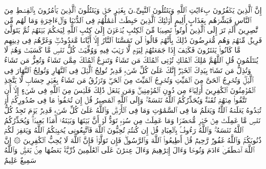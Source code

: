 \stopbuffer
\startbuffer[\q:3:21]
إِنَّ ٱلَّذِینَ یَكۡفُرُونَ بِءَایَٰتِ ٱللَّهِ وَیَقۡتُلُونَ ٱلنَّبِیِّۦنَ بِغَیۡرِ حَقࣲّ وَیَقۡتُلُونَ ٱلَّذِینَ یَأۡمُرُونَ بِٱلۡقِسۡطِ مِنَ ٱلنَّاسِ فَبَشِّرۡهُم بِعَذَابٍ أَلِیمٍ%
\stopbuffer
\startbuffer[\q:3:22]
أُو۟لَٰۤئِكَ ٱلَّذِینَ حَبِطَتۡ أَعۡمَٰلُهُمۡ فِی ٱلدُّنۡیَا وَٱلۡءَاخِرَةِ وَمَا لَهُم مِّن نَّٰصِرِینَ%
\stopbuffer
\startbuffer[\q:3:23]
أَلَمۡ تَرَ إِلَى ٱلَّذِینَ أُوتُوا۟ نَصِیبࣰا مِّنَ ٱلۡكِتَٰبِ یُدۡعَوۡنَ إِلَىٰ كِتَٰبِ ٱللَّهِ لِیَحۡكُمَ بَیۡنَهُمۡ ثُمَّ یَتَوَلَّىٰ فَرِیقࣱ مِّنۡهُمۡ وَهُم مُّعۡرِضُونَ%
\stopbuffer
\startbuffer[\q:3:24]
ذَٰلِكَ بِأَنَّهُمۡ قَالُوا۟ لَن تَمَسَّنَا ٱلنَّارُ إِلَّاۤ أَیَّامࣰا مَّعۡدُودَٰتࣲۖ وَغَرَّهُمۡ فِی دِینِهِم مَّا كَانُوا۟ یَفۡتَرُونَ%
\stopbuffer
\startbuffer[\q:3:25]
فَكَیۡفَ إِذَا جَمَعۡنَٰهُمۡ لِیَوۡمࣲ لَّا رَیۡبَ فِیهِ وَوُفِّیَتۡ كُلُّ نَفۡسࣲ مَّا كَسَبَتۡ وَهُمۡ لَا یُظۡلَمُونَ%
\stopbuffer
\startbuffer[\q:3:26]
قُلِ ٱللَّهُمَّ مَٰلِكَ ٱلۡمُلۡكِ تُؤۡتِی ٱلۡمُلۡكَ مَن تَشَاۤءُ وَتَنزِعُ ٱلۡمُلۡكَ مِمَّن تَشَاۤءُ وَتُعِزُّ مَن تَشَاۤءُ وَتُذِلُّ مَن تَشَاۤءُۖ بِیَدِكَ ٱلۡخَیۡرُۖ إِنَّكَ عَلَىٰ كُلِّ شَیۡءࣲ قَدِیرࣱ%
\stopbuffer
\startbuffer[\q:3:27]
تُولِجُ ٱلَّیۡلَ فِی ٱلنَّهَارِ وَتُولِجُ ٱلنَّهَارَ فِی ٱلَّیۡلِۖ وَتُخۡرِجُ ٱلۡحَیَّ مِنَ ٱلۡمَیِّتِ وَتُخۡرِجُ ٱلۡمَیِّتَ مِنَ ٱلۡحَیِّۖ وَتَرۡزُقُ مَن تَشَاۤءُ بِغَیۡرِ حِسَابࣲ%
\stopbuffer
\startbuffer[\q:3:28]
لَّا یَتَّخِذِ ٱلۡمُؤۡمِنُونَ ٱلۡكَٰفِرِینَ أَوۡلِیَاۤءَ مِن دُونِ ٱلۡمُؤۡمِنِینَۖ وَمَن یَفۡعَلۡ ذَٰلِكَ فَلَیۡسَ مِنَ ٱللَّهِ فِی شَیۡءٍ إِلَّاۤ أَن تَتَّقُوا۟ مِنۡهُمۡ تُقَىٰةࣰۗ وَیُحَذِّرُكُمُ ٱللَّهُ نَفۡسَهُۥۗ وَإِلَى ٱللَّهِ ٱلۡمَصِیرُ%
\stopbuffer
\startbuffer[\q:3:29]
قُلۡ إِن تُخۡفُوا۟ مَا فِی صُدُورِكُمۡ أَوۡ تُبۡدُوهُ یَعۡلَمۡهُ ٱللَّهُۗ وَیَعۡلَمُ مَا فِی ٱلسَّمَٰوَٰتِ وَمَا فِی ٱلۡأَرۡضِۗ وَٱللَّهُ عَلَىٰ كُلِّ شَیۡءࣲ قَدِیرࣱ%
\stopbuffer
\startbuffer[\q:3:30]
یَوۡمَ تَجِدُ كُلُّ نَفۡسࣲ مَّا عَمِلَتۡ مِنۡ خَیۡرࣲ مُّحۡضَرࣰا وَمَا عَمِلَتۡ مِن سُوۤءࣲ تَوَدُّ لَوۡ أَنَّ بَیۡنَهَا وَبَیۡنَهُۥۤ أَمَدَۢا بَعِیدࣰاۗ وَیُحَذِّرُكُمُ ٱللَّهُ نَفۡسَهُۥۗ وَٱللَّهُ رَءُوفُۢ بِٱلۡعِبَادِ%
\stopbuffer
\startbuffer[\q:3:31]
قُلۡ إِن كُنتُمۡ تُحِبُّونَ ٱللَّهَ فَٱتَّبِعُونِی یُحۡبِبۡكُمُ ٱللَّهُ وَیَغۡفِرۡ لَكُمۡ ذُنُوبَكُمۡۚ وَٱللَّهُ غَفُورࣱ رَّحِیمࣱ%
\stopbuffer
\startbuffer[\q:3:32]
قُلۡ أَطِیعُوا۟ ٱللَّهَ وَٱلرَّسُولَۖ فَإِن تَوَلَّوۡا۟ فَإِنَّ ٱللَّهَ لَا یُحِبُّ ٱلۡكَٰفِرِینَ%
\stopbuffer
\startbuffer[\q:3:33]
۞ إِنَّ ٱللَّهَ ٱصۡطَفَىٰۤ ءَادَمَ وَنُوحࣰا وَءَالَ إِبۡرَٰهِیمَ وَءَالَ عِمۡرَٰنَ عَلَى ٱلۡعَٰلَمِینَ%
\stopbuffer
\startbuffer[\q:3:34]
ذُرِّیَّةَۢ بَعۡضُهَا مِنۢ بَعۡضࣲۗ وَٱللَّهُ سَمِیعٌ عَلِیمٌ%
